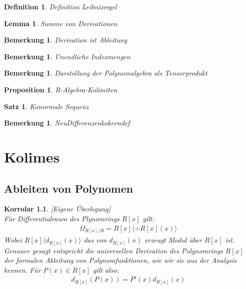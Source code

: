 \documentclass[10pt,a4paper]{report}
\newcounter{Aussage}[chapter]
\newtheorem{satz}[Aussage]{Satz}
\newtheorem{prop}[Aussage]{Proposition}
\newtheorem{korrolar}[Aussage]{Korrolar}
\newtheorem{lemma}[Aussage]{Lemma}
\newtheorem{bem}[Aussage]{Bemerkung}
\newtheorem{definition}[Aussage]{Definition}
\newcommand{\divR}[2]{\Omega_{#1/#2}}
\newcommand{\divf}[1]{d_{#1}}
\begin{document}
\begin{definition}\label{Definition Leibnizregel}
Definition Leibnizregel
\end{definition}

\begin{lemma}\label{Summe von Derivationen}
Summe von Derivationen
\end{lemma}

\begin{bem}\label{Derivation ist Ableitung}
Derivation ist Ableitung
\end{bem}

\begin{bem}\label{Unendliche Indexmengen}
Unendliche Indexmengen
\end{bem}

\begin{bem}\label{Darstellung der Polynomalgebra als Tensorprodukt}
Darstellung der Polynomalgebra als Tensorprodukt
\end{bem}

\begin{prop}\label{R-Algebra-Kolimiten}
R-Algebra-Kolimiten
\end{prop}

\begin{satz}\label{Konormale Sequenz}
Konormale Sequenz
\end{satz}

\begin{bem}\label{NeuDifferenzenkokerndef}
NeuDifferenzenkokerndef
\end{bem}
\chapter{Kolimes}
\section{Ableiten von Polynomen}
\begin{korrolar}\label{NNDerivation ist Ableitung}\textit{[Eigene Überlegung]}\\
Für Differentialraum des Plynomrings $R[x]$ gilt:
\begin{gather*}
\divR{R[x]}{R} = R[x]\langle \div{R[x]}(x) \rangle
\end{gather*}
Wobei $R[x] \langle \divf{R[x]}(x)\rangle$ das von $\divf{R[x]}(x)$ erzeugt Modul über $R[x]$ ist.\\
Genauer gesagt entspricht die universellen Derivation des Polynomrings $R[x]$ der formalen Ableitung von Polynomfunktionen, wie wir sie aus der Analysis kennen. Für $P(x) \in R[x]$ gilt also:
\begin{gather*}
\divf{R[x]}(P(x)) = P'(x)\divf{R[x]}(x)
\end{gather*}
\end{korrolar}
\end{document}
